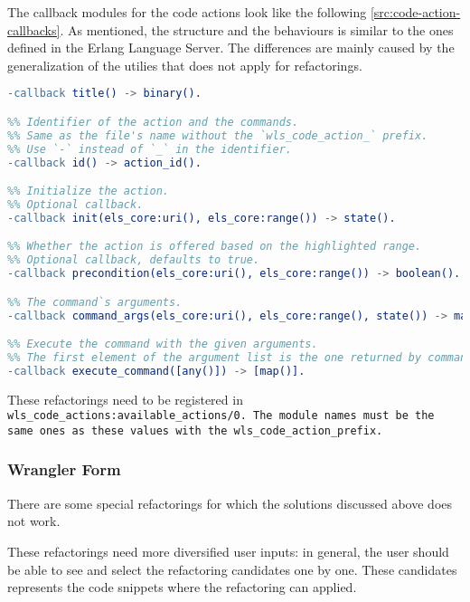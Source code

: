 The callback modules for the code actions look like the following \ref{src:code-action-callbacks}. As mentioned, the structure and the behaviours is similar to the ones defined in the Erlang Language Server. The differences are mainly caused by the generalization of the utilies that does not apply for refactorings.

\begin{lstlisting}[language=erlang]
%% Title which is shown to the user.
-callback title() -> binary().

%% Identifier of the action and the commands. 
%% Same as the file's name without the `wls_code_action_` prefix.
%% Use `-` instead of `_` in the identifier.
-callback id() -> action_id().

%% Initialize the action. 
%% Optional callback.
-callback init(els_core:uri(), els_core:range()) -> state().

%% Whether the action is offered based on the highlighted range. 
%% Optional callback, defaults to true.
-callback precondition(els_core:uri(), els_core:range()) -> boolean().

%% The command`s arguments.
-callback command_args(els_core:uri(), els_core:range(), state()) -> map().

%% Execute the command with the given arguments. 
%% The first element of the argument list is the one returned by command_args. 
-callback execute_command([any()]) -> [map()].
\end{lstlisting}

These refactorings need to be registered in \tt wls\_code\_actions:available\_actions/0\rm . 
The module names must be the same ones as these values with the \tt wls\_code\_action\_\rm prefix.




\subsubsection{Wrangler Form}
\label{src:wrangler-forms}

There are some special refactorings for which the solutions discussed above does not work.

These refactorings need more diversified user inputs: in general, the user should be able to see and select the refactoring candidates one by one. These candidates represents the code snippets where the refactoring can applied.

